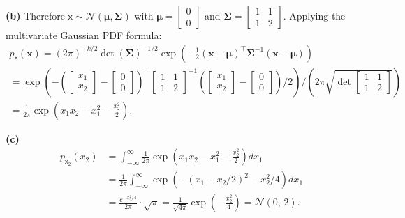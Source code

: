 \begin{solution}
    \textbf{(b)} Therefore $\boldsymbol{\mathsf{x}} \sim \mathcal{N}(\boldsymbol{\mu}, \boldsymbol{\Sigma})$ with $\boldsymbol{\mu} = \begin{bmatrix}0\\0\end{bmatrix}$ and $\boldsymbol{\Sigma} = \begin{bmatrix}1&1\\1&2\end{bmatrix}$.
    Applying the multivariate Gaussian PDF formula:
    \begin{multline*}
        p_{\boldsymbol{\mathsf{x}}}(\mathbf{x})
        = (2\pi)^{-k/2} \det(\boldsymbol{\Sigma})^{-1/2}
          \exp\!\left(
              -\frac{1}{2}(\mathbf{x}-\boldsymbol{\mu})^{\top}
              \boldsymbol{\Sigma}^{-1}
              (\mathbf{x}-\boldsymbol{\mu})
          \right) \\
        = \exp\!\left(
              -\left(
                  \begin{bmatrix}x_{1}\\x_{2}\end{bmatrix}
                  - \begin{bmatrix}0\\0\end{bmatrix}
              \right)^{\!\top}
              \begin{bmatrix}1&1\\1&2\end{bmatrix}^{-1}
              \left(
                  \begin{bmatrix}x_{1}\\x_{2}\end{bmatrix}
                  - \begin{bmatrix}0\\0\end{bmatrix}
              \right)\bigg/2
          \right)
          \Bigg/
          \left(
              2\pi\sqrt{\det\!\begin{bmatrix}1&1\\1&2\end{bmatrix}}
          \right) \\
        = \frac{1}{2\pi}
          \exp\!\left(x_{1}x_{2} - x_{1}^{2} - \frac{x_{2}^{2}}{2}\right).
    \end{multline*}

    \textbf{(c)}
    \begin{align*}
        p_{\mathsf{x}_{2}}(x_{2})
        &= \int_{-\infty}^{\infty}
           \frac{1}{2\pi}
           \exp\!\left(x_{1}x_{2} - x_{1}^{2} - \frac{x_{2}^{2}}{2}\right)
           dx_{1} \\
        &= \frac{1}{2\pi}
           \int_{-\infty}^{\infty}
           \exp\!\left(-(x_{1} - x_{2}/2)^{2} - x_{2}^{2}/4\right)
           dx_{1} \\
        &= \frac{e^{-x_{2}^{2}/4}}{2\pi} \cdot \sqrt{\pi}
         = \frac{1}{\sqrt{4\pi}}
           \exp\!\left(-\frac{x_{2}^{2}}{4}\right)
         = \mathcal{N}(0,\,2).
    \end{align*}


\end{solution}
